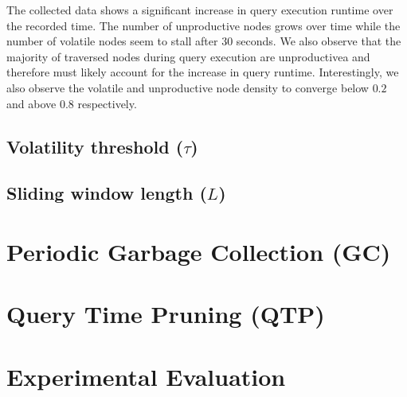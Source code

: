 \documentclass[abstracton,12pt]{scrartcl}
\theoremstyle{definition}
\begin{document}
The collected data shows a significant increase in query execution runtime over the
recorded time. The number of unproductive nodes grows over time while the number
of volatile nodes seem to stall after 30 seconds. We also observe that the
majority of traversed nodes during query execution are unproductivea and
therefore must likely account for the increase in query runtime. Interestingly,
we also observe the volatile and unproductive node density to converge below
$0.2$ and above $0.8$ respectively.

\subsection{Volatility threshold ($\tau$)}

\subsection{Sliding window length ($L$)}



\section{Periodic Garbage Collection (GC)}

\section{Query Time Pruning (QTP)}

\section{Experimental Evaluation}






\newpage



\end{document}
